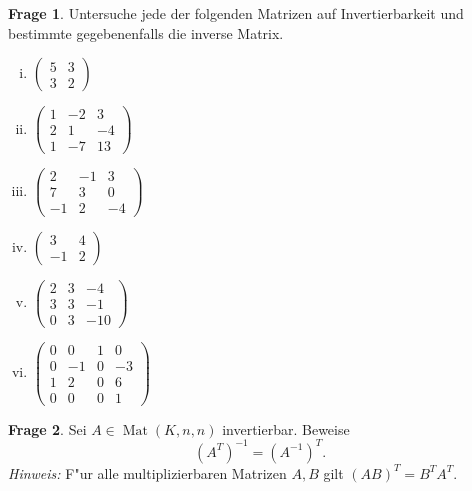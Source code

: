 \documentclass{scrartcl}
\theoremstyle{definition}
\newtheorem{frage}{Frage}[section]
\DeclareMathOperator{\Mat}{Mat}
\begin{document}
\begin{frage}
Untersuche jede der folgenden Matrizen auf Invertierbarkeit und bestimmte
gegebenenfalls die inverse Matrix.
\begin{multicols}{3}
\begin{enumerate}[(i)]
\item $\begin{pmatrix} 5 & 3 \\ 3 & 2 \end{pmatrix}$
\item $\begin{pmatrix} 1 & -2 & 3 \\ 2 & 1 & -4 \\ 1 & -7 & 13\end{pmatrix}$
\item $\begin{pmatrix} 2 & -1 & 3 \\ 7 & 3 &  0 \\ -1 & 2 & -4\end{pmatrix}$
\item $\begin{pmatrix} 3 & 4 \\ -1 & 2 \end{pmatrix}$
\item $\begin{pmatrix} 2 & 3 & -4 \\ 3 & 3 & -1 \\ 0 & 3 & -10\end{pmatrix}$
\item $\begin{pmatrix} 0 & 0 & 1 & 0 \\ 0 & -1 & 0 & -3 \\ 1 & 2 & 0 & 6 \\ 0 & 0 & 0 & 1 \end{pmatrix}$
\end{enumerate}
\end{multicols}
\end{frage}

\begin{frage} Sei $A \in \Mat(K, n, n)$ invertierbar.
Beweise
\[ \left(A^T \right)^{-1} = \left(A^{-1} \right)^T. \]
\emph{Hinweis:} F"ur alle multiplizierbaren Matrizen $A,B$ gilt
$(AB)^T = B^T A^T$.
\end{frage}
\end{document}
